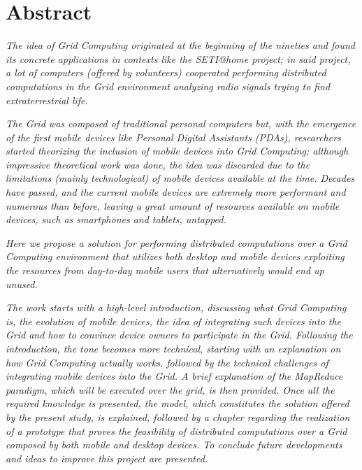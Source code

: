 \chapter*{Abstract}
\begin{spacing}{1.3}
\textit{\small
The idea of Grid Computing originated at the beginning of the nineties and found its concrete applications in contexts like the SETI@home project; in said project, a lot of computers (offered by volunteers) cooperated performing distributed computations in the Grid environment analyzing radio signals trying to find extraterrestrial life.
}\newline

\textit{\small
The Grid was composed of traditional personal computers but, with the emergence of the first mobile devices like Personal Digital Assistants (PDAs), researchers started theorizing the inclusion of mobile devices into Grid Computing; although impressive theoretical work was done, the idea was discarded due to the limitations (mainly technological) of mobile devices available at the time. Decades have passed, and the current mobile devices are extremely more performant and numerous than before, leaving a great amount of resources available on mobile devices, such as smartphones and tablets, untapped.
}\newline

\textit{\small
Here we propose a solution for performing distributed computations over a Grid Computing environment that utilizes both desktop and mobile devices exploiting the resources from day-to-day mobile users that alternatively would end up unused.
}\newline

\textit{\small
The work starts with a high-level introduction, discussing what Grid Computing is, the evolution of mobile devices, the idea of integrating such devices into the Grid and how to convince device owners to participate in the Grid. Following the introduction, the tone becomes more technical, starting with an explanation on how Grid Computing actually works, followed by the technical challenges of integrating mobile devices into the Grid. A brief explanation of the MapReduce paradigm, which will be executed over the grid, is then provided. Once all the required knowledge is presented, the model, which constitutes the solution offered by the present study, is explained, followed by a chapter regarding the realization of a prototype that proves the feasibility of distributed computations over a Grid composed by both mobile and desktop devices. To conclude future developments and ideas to improve this project are presented.
}
\end{spacing}
